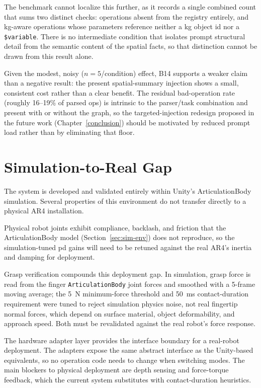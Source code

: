 \documentclass[
     12pt,
     a4paper,
     BCOR=10mm,
     DIV=14,
     listof=totoc,
     bibliography=totoc,
     parskip,
     twoside,
     headsepline
     ]{scrreprt}
\begin{document}
The benchmark cannot localize this further, as it records a single combined count that sums two distinct checks: operations absent from the registry entirely, and \gls{kg}-aware operations whose parameters reference neither a \gls{kg} object id nor a \texttt{\$variable}. There is no intermediate condition that isolates prompt structural detail from the semantic content of the spatial facts, so that distinction cannot be drawn from this result alone.

Given the modest, noisy ($n=5$/condition) effect, B14 supports a weaker claim than a negative result: the present spatial-summary injection shows a small, consistent cost rather than a clear benefit. The residual bad-operation rate (roughly 16--19\% of parsed ops) is intrinsic to the parser/task combination and present with or without the graph, so the targeted-injection redesign proposed in the future work (Chapter~\ref{conclusion}) should be motivated by reduced prompt load rather than by eliminating that floor.

\section{Simulation-to-Real Gap}\label{sec:sim-to-real}
The system is developed and validated entirely within Unity's ArticulationBody simulation. Several properties of this environment do not transfer directly to a physical AR4 installation.

Physical robot joints exhibit compliance, backlash, and friction that the ArticulationBody model (Section~\ref{sec:sim-env}) does not reproduce, so the simulation-tuned \gls{pd} gains will need to be retuned against the real AR4's inertia and damping for deployment.

Grasp verification compounds this deployment gap. In simulation, grasp force is read from the finger \texttt{ArticulationBody} joint forces and smoothed with a 5-frame moving average; the 5~N minimum-force threshold and 50~ms contact-duration requirement were tuned to reject simulation physics noise, not real fingertip normal forces, which depend on surface material, object deformability, and approach speed. Both must be revalidated against the real robot's force response.

The hardware adapter layer provides the interface boundary for a real-robot deployment. The adapters expose the same abstract interface as the Unity-based equivalents, so no operation code needs to change when switching modes. The main blockers to physical deployment are depth sensing and force-torque feedback, which the current system substitutes with contact-duration heuristics.
\end{document}
